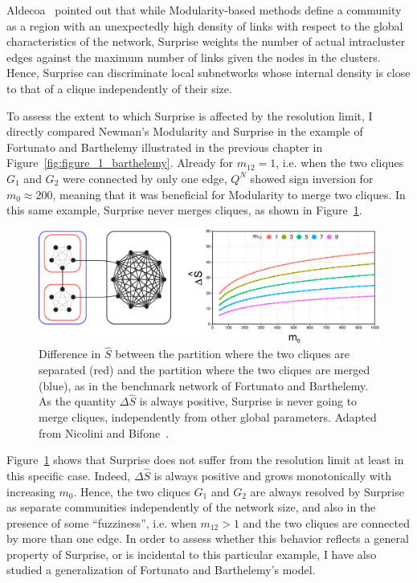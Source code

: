 Aldecoa~\cite{aldecoa2011} pointed out that while Modularity-based methods define a community as a region with an unexpectedly high density of links with respect to the global characteristics of the network, Surprise weights the number of actual intracluster edges against the maximum number of links given the nodes in the clusters.
Hence, Surprise can discriminate local subnetworks whose internal density is close to that of a clique independently of their size.

To assess the extent to which Surprise is affected by the resolution limit, I directly compared Newman's Modularity and Surprise in the example of Fortunato and Barthelemy illustrated in the previous chapter in Figure~\ref{fig:figure_1_barthelemy}. Already for $m_{12} = 1$, i.e. when the two cliques $G_1$ and $G_2$ were connected by only one edge, $Q^N$ showed sign inversion for $m_0 \approx 200$, meaning that it was beneficial for Modularity to merge two cliques.
In this same example, Surprise never merges cliques, as shown in Figure~\ref{fig:barthelemy_surprise}.

\begin{figure}[htb!]
\centering
\includegraphics[width=1.0\textwidth]{images/barthelemy_surprise.pdf}
\caption{Difference in $\hat{S}$ between the partition where the two cliques are separated (red) and the partition where the two cliques are merged (blue), as in the benchmark network of Fortunato and Barthelemy. As the quantity $\Delta \hat{S}$ is always positive, Surprise is never going to merge cliques, independently from other global parameters. Adapted from Nicolini and Bifone~\cite{nicolini2016}.}
\label{fig:barthelemy_surprise}
\end{figure}

Figure~\ref{fig:barthelemy_surprise} shows that Surprise does not suffer from the resolution limit at least in this specific case.
Indeed, $\Delta \hat{S}$ is always positive and grows monotonically with increasing $m_0$. 
Hence, the two cliques $G_1$ and $G_2$ are always resolved by Surprise as separate communities independently of the network size, and also in the presence of some ``fuzziness'', i.e. when $m_{12}>1$ and the two cliques are connected by more than one edge.
In order to assess whether this behavior reflects a general property of Surprise, or is incidental to this particular example, I have also studied a generalization of Fortunato and Barthelemy's model.


